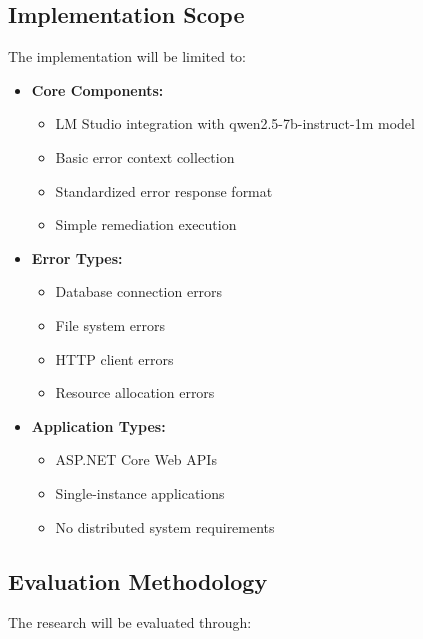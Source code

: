 \subsection{Implementation Scope}
The implementation will be limited to:

\begin{itemize}
    \item \textbf{Core Components:}
    \begin{itemize}
        \item LM Studio integration with qwen2.5-7b-instruct-1m model
        \item Basic error context collection
        \item Standardized error response format
        \item Simple remediation execution
    \end{itemize}
    \item \textbf{Error Types:}
    \begin{itemize}
        \item Database connection errors
        \item File system errors
        \item HTTP client errors
        \item Resource allocation errors
    \end{itemize}
    \item \textbf{Application Types:}
    \begin{itemize}
        \item ASP.NET Core Web APIs
        \item Single-instance applications
        \item No distributed system requirements
    \end{itemize}
\end{itemize}

\subsection{Evaluation Methodology}
The research will be evaluated through:

